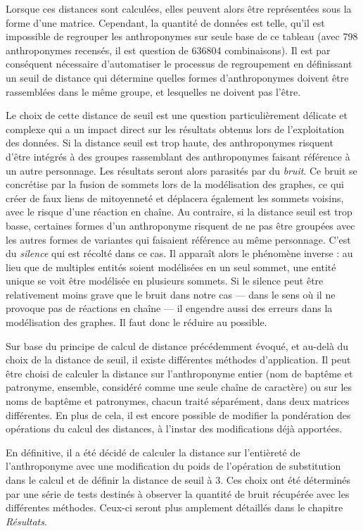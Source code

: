 Lorsque ces distances sont calculées, elles peuvent alors être représentées sous la forme d'une matrice. Cependant, la quantité de données  est telle, qu'il est impossible de regrouper les anthroponymes sur seule base de ce tableau (avec 798 anthroponymes recensés, il est question de 636804 combinaisons). Il est par conséquent nécessaire d'automatiser le processus de regroupement en définissant  un seuil de distance qui détermine quelles formes d'anthroponymes doivent être rassemblées dans le même groupe, et lesquelles ne doivent pas l'être. 

Le choix de cette distance de seuil est une question particulièrement délicate et complexe qui a un impact  direct sur les résultats obtenus lors de l'exploitation des données. Si la distance seuil est trop haute, des anthroponymes risquent d'être intégrés à des groupes rassemblant des anthroponymes faisant référence à un autre personnage. Les résultats seront alors parasités par du \textit{bruit}. Ce bruit se concrétise par la fusion de sommets lors de la modélisation des graphes, ce qui créer de faux liens de mitoyenneté et déplacera également les sommets voisins, avec le risque d'une réaction en chaîne.
Au contraire, si la distance seuil est trop basse, certaines formes d'un anthroponyme risquent de ne pas être groupées avec les autres formes de variantes qui faisaient référence au même personnage. C'est du \textit{silence} qui est récolté dans ce cas. Il apparaît alors le phénomène inverse : au lieu que de multiples entités soient modélisées en un seul sommet, une entité unique se voit être modélisée en plusieurs sommets. Si le silence peut être relativement moins grave que le bruit dans notre cas --- dans le sens où il ne provoque pas de réactions en chaîne --- il engendre aussi des erreurs dans la modélisation des graphes. Il faut donc le réduire au possible.

Sur base du principe de calcul de distance précédemment évoqué, et au-delà du choix de la distance de seuil, il existe différentes méthodes d'application. Il peut être choisi de calculer la distance sur l'anthroponyme entier (nom de baptême et patronyme, ensemble, considéré comme une seule chaîne de caractère) ou sur les noms de baptême  et patronymes, chacun traité séparément, dans deux matrices différentes. En plus de cela, il est encore possible de modifier la pondération des opérations du  calcul des distances, à l'instar des modifications déjà apportées.

En définitive, il a été décidé de calculer la distance sur l'entièreté de l'anthroponyme avec  une modification du poids de l'opération de substitution dans le calcul et de définir la distance de seuil à 3. 
Ces choix ont été déterminés par une série de tests destinés à observer la quantité de bruit récupérée avec les différentes méthodes. Ceux-ci seront plus amplement détaillés dans le chapitre \textit{Résultats}.

